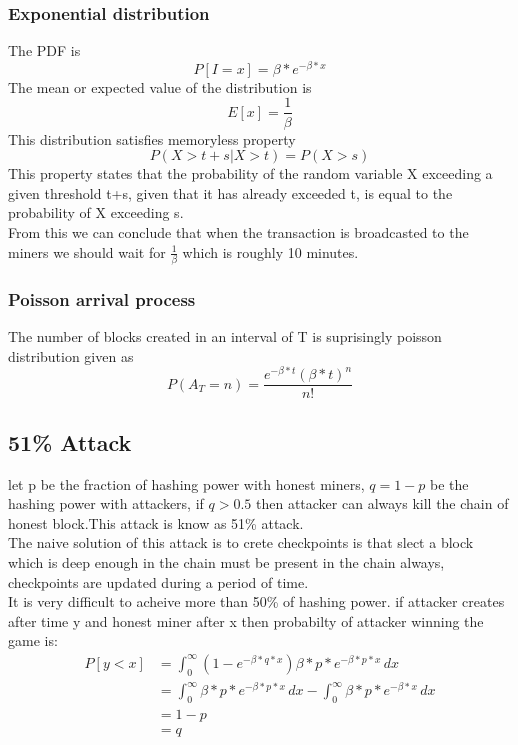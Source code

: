 \documentclass{article}
\begin{document}
\subsubsection{Exponential distribution}
The PDF is
$$P[I = x ] = \beta*e^{-\beta*x}$$
The mean or expected value of the distribution is 
$$E[x] = \frac{1}{\beta}$$
This distribution satisfies memoryless property
$$P(X>t+s | X>t)=P(X>s)$$
This property states that the probability of the random variable X exceeding a given threshold t+s, given that it has already exceeded t, is equal to the probability of X exceeding s. \\
From this we can conclude that when the transaction is broadcasted to the miners we should wait for $\frac{1}{\beta}$ which is roughly 10 minutes.
\subsubsection{Poisson arrival process}
The number of blocks created in an interval of T is suprisingly poisson distribution given as 
$$P\left( A_{T} = n \right) = \frac{{e^{ - \beta*t } (\beta *t) ^n }}{{n!}}$$
\subsection{ 51\% Attack}
let p be the fraction of hashing power with honest miners, $q = 1 - p $ be the hashing power with attackers, if $q > 0.5$ then attacker can always kill the chain of honest block.This attack is know as 51\% attack. \\
The naive solution of this attack is to crete checkpoints is that slect a block which is deep enough in the chain must be present in the chain always, checkpoints are updated during a period of time. \\
It is very difficult to acheive more than 50\% of hashing power.
if attacker creates after time y and honest miner after x then probabilty of attacker winning the game is:
\begin{align*}
    P[y < x] &= \int_{0}^{\infty} (1-e^{-\beta*q*x})\beta*p*e^{-\beta*p*x} \, dx\\
      &= \int_{0}^{\infty}\beta*p*e^{-\beta*p*x} \, dx - \int_{0}^{\infty} \beta*p*e^{-\beta*x} \, dx \\
      &= 1 - p \\
      & = q
\end{align*}
\end{document}
